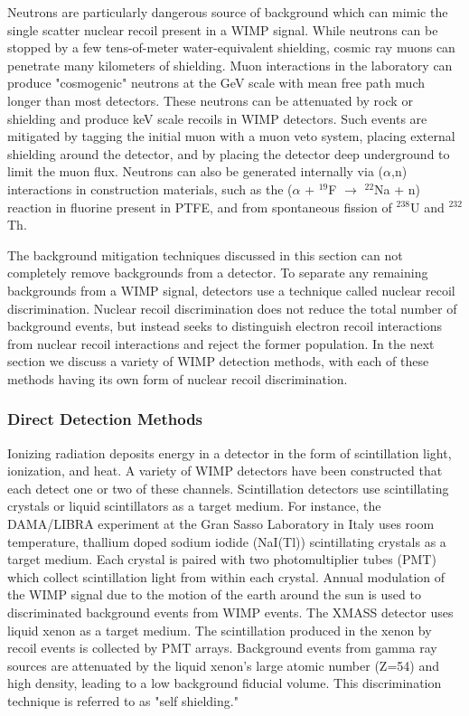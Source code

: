 Neutrons are particularly dangerous source of background which can mimic the single scatter nuclear recoil present in a WIMP signal.  While neutrons can be stopped by a few tens-of-meter water-equivalent shielding, cosmic ray muons can penetrate many kilometers of shielding.  Muon interactions in the laboratory can produce "cosmogenic" neutrons at the GeV scale with mean free path much longer than most detectors.  These neutrons can be attenuated by rock or shielding and produce keV scale recoils in WIMP detectors.   Such events are mitigated by tagging the initial muon with a muon veto system, placing external shielding around the detector, and by placing the detector deep underground to limit the muon flux.  Neutrons can also be generated internally via ($\alpha$,n) interactions in construction materials, such as the ($\alpha$ + $^{19}$F $\rightarrow$ $^{22}$Na + n) reaction in fluorine present in PTFE, and from spontaneous fission of $^{238}$U and $^{232}$Th.  

The background mitigation techniques discussed in this section can not completely remove backgrounds from a detector.  To separate any remaining backgrounds from a WIMP signal, detectors use a technique called nuclear recoil discrimination.  Nuclear recoil discrimination does not reduce the total number of background events, but instead seeks to distinguish electron recoil interactions from nuclear recoil interactions and reject the former population.  In the next section we discuss a variety of WIMP detection methods, with each of these methods having its own form of nuclear recoil discrimination. 

\subsubsection{Direct Detection Methods} 
Ionizing radiation deposits energy in a detector in the form of scintillation light, ionization, and heat.  A variety of WIMP detectors have been constructed that each detect one or two of these channels.  Scintillation detectors use scintillating crystals or liquid scintillators as a target medium. For instance, the DAMA/LIBRA experiment at the Gran Sasso Laboratory in Italy uses room temperature, thallium doped sodium iodide (NaI(Tl)) scintillating crystals as a target medium.  Each crystal is paired with two photomultiplier tubes (PMT) which collect scintillation light from within each crystal.  Annual modulation of the WIMP signal due to the motion of the earth around the sun is used to discriminated background events from WIMP events.  The XMASS detector uses liquid xenon as a target medium.  The scintillation produced in the xenon by recoil events is collected by PMT arrays. Background events from gamma ray sources are attenuated by the liquid xenon's large atomic number (Z=54) and high density, leading to a low background fiducial volume.  This discrimination technique is referred to as "self shielding." 

